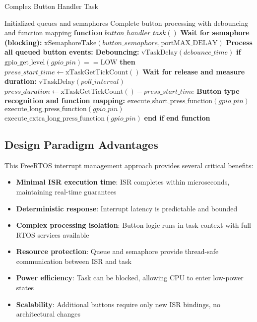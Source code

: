 \documentclass{article}
\begin{document}
\begin{algorithm}
\caption{Complex Button Handler Task}
\label{alg:button_task}
\begin{algorithmic}[1]
\REQUIRE Initialized queues and semaphores
\ENSURE Complete button processing with debouncing and function mapping
\STATE \textbf{function} $button\_handler\_task()$
    \STATE \textbf{Wait for semaphore (blocking):}
    \STATE $\text{xSemaphoreTake}(button\_semaphore, \text{portMAX\_DELAY})$
    \STATE
    \STATE \textbf{Process all queued button events:}
        \STATE \textbf{Debouncing:}
        \STATE $\text{vTaskDelay}(debounce\_time)$ 
        \STATE \textbf{if} $\text{gpio\_get\_level}(gpio\_pin) == \text{LOW}$ \textbf{then}
            \STATE $press\_start\_time \leftarrow \text{xTaskGetTickCount}()$
            \STATE \textbf{Wait for release and measure duration:}
                \STATE $\text{vTaskDelay}(poll\_interval)$
            \ENDWHILE
            \STATE $press\_duration \leftarrow \text{xTaskGetTickCount}() - press\_start\_time$
            \STATE
            \STATE \textbf{Button type recognition and function mapping:}
                \STATE $\text{execute\_short\_press\_function}(gpio\_pin)$
                \STATE $\text{execute\_long\_press\_function}(gpio\_pin)$
            \ELSE
                \STATE $\text{execute\_extra\_long\_press\_function}(gpio\_pin)$
            \ENDIF
        \STATE \textbf{end if}
    \ENDWHILE
\ENDWHILE
\STATE \textbf{end function}
\end{algorithmic}
\end{algorithm}

\subsection{Design Paradigm Advantages}

This FreeRTOS interrupt management approach provides several critical benefits:

\begin{itemize}
    \item \textbf{Minimal ISR execution time}: ISR completes within microseconds, maintaining real-time guarantees
    \item \textbf{Deterministic response}: Interrupt latency is predictable and bounded
    \item \textbf{Complex processing isolation}: Button logic runs in task context with full RTOS services available
    \item \textbf{Resource protection}: Queue and semaphore provide thread-safe communication between ISR and task
    \item \textbf{Power efficiency}: Task can be blocked, allowing CPU to enter low-power states
    \item \textbf{Scalability}: Additional buttons require only new ISR bindings, no architectural changes
\end{itemize}
\end{document}
